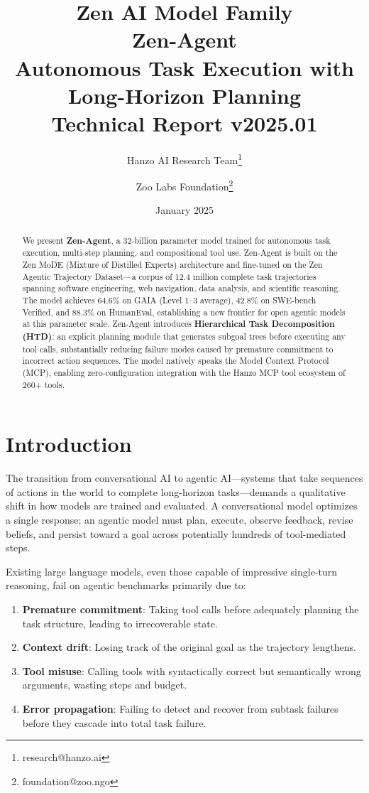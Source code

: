 \documentclass[11pt,a4paper]{article}
\title{
    \vspace{-2cm}
    \Large \textbf{Zen AI Model Family} \\
    \vspace{0.5cm}
    \Huge \textbf{Zen-Agent} \\
    \vspace{0.3cm}
    \large Autonomous Task Execution with Long-Horizon Planning \\
    \vspace{0.5cm}
    \normalsize Technical Report v2025.01
}
\author{
    Hanzo AI Research Team\thanks{research@hanzo.ai} \and
    Zoo Labs Foundation\thanks{foundation@zoo.ngo}
}
\date{January 2025}
\begin{document}
\maketitle

\begin{abstract}
We present \textbf{Zen-Agent}, a 32-billion parameter model trained for autonomous task execution,
multi-step planning, and compositional tool use. Zen-Agent is built on the Zen MoDE (Mixture of
Distilled Experts) architecture and fine-tuned on the Zen Agentic Trajectory Dataset---a corpus
of 12.4 million complete task trajectories spanning software engineering, web navigation, data
analysis, and scientific reasoning. The model achieves 64.6\% on GAIA (Level 1--3 average),
42.8\% on SWE-bench Verified, and 88.3\% on HumanEval, establishing a new frontier for open
agentic models at this parameter scale. Zen-Agent introduces \textbf{Hierarchical Task
Decomposition (HTD)}: an explicit planning module that generates subgoal trees before executing
any tool calls, substantially reducing failure modes caused by premature commitment to incorrect
action sequences. The model natively speaks the Model Context Protocol (MCP), enabling
zero-configuration integration with the Hanzo MCP tool ecosystem of 260+ tools.
\end{abstract}

\tableofcontents
\newpage

\section{Introduction}

The transition from conversational AI to agentic AI---systems that take sequences of actions in
the world to complete long-horizon tasks---demands a qualitative shift in how models are trained
and evaluated. A conversational model optimizes a single response; an agentic model must plan,
execute, observe feedback, revise beliefs, and persist toward a goal across potentially hundreds
of tool-mediated steps.

Existing large language models, even those capable of impressive single-turn reasoning, fail on
agentic benchmarks primarily due to:

\begin{enumerate}
    \item \textbf{Premature commitment}: Taking tool calls before adequately planning the task
    structure, leading to irrecoverable state.
    \item \textbf{Context drift}: Losing track of the original goal as the trajectory lengthens.
    \item \textbf{Tool misuse}: Calling tools with syntactically correct but semantically wrong
    arguments, wasting steps and budget.
    \item \textbf{Error propagation}: Failing to detect and recover from subtask failures before
    they cascade into total task failure.
\end{enumerate}
\end{document}
